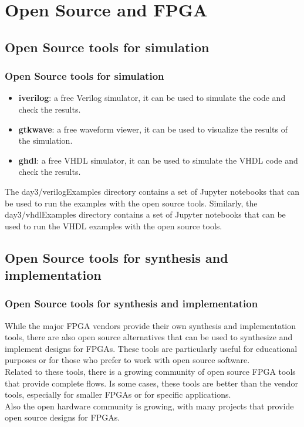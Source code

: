 \documentclass{beamer}
\begin{document}
\section{Open Source and FPGA}

\subsection{Open Source tools for simulation}

\begin{frame}\frametitle{Open Source tools for simulation}
\begin{itemize}
	\item \textbf{iverilog}: a free Verilog simulator, it can be used to simulate the code and check the results.
	\vspace{0.3cm}
	\item \textbf{gtkwave}: a free waveform viewer, it can be used to visualize the results of the simulation.
	\vspace{0.3cm}
	\item \textbf{ghdl}: a free VHDL simulator, it can be used to simulate the VHDL code and check the results.
\end{itemize}
\vspace{0.3cm}
The day3/verilogExamples directory contains a set of 
Jupyter notebooks that can be used to run the examples
with the open source tools.
\vspace{0.3cm}
Similarly, the day3/vhdlExamples directory contains a set
of Jupyter notebooks that can be used to run the VHDL examples with the open source tools.
\end{frame}

\subsection{Open Source tools for synthesis and implementation}

\begin{frame}\frametitle{Open Source tools for synthesis and implementation}
While the major FPGA vendors provide their own synthesis 
and implementation tools, there are also open source alternatives 
that can be used to synthesize and implement designs 
for FPGAs. These tools are particularly useful for 
educational purposes or for those who prefer to work 
with open source software. \\
\vspace{0.5cm}
Related to these tools, there is a growing community of
open source FPGA tools that provide complete flows. Is 
some cases, these tools are better than the vendor tools,
especially for smaller FPGAs or for specific applications. \\
\vspace{0.5cm}
Also the open hardware community is growing, with many
projects that provide open source designs for FPGAs.

\end{frame}
\end{document}
